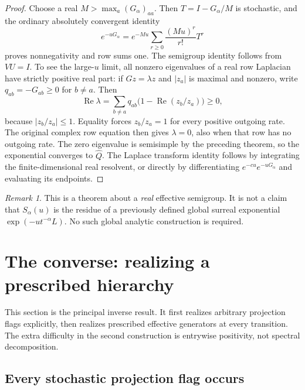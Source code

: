 \documentclass[11pt]{article}
\numberwithin{equation}{section}
\theoremstyle{definition}
\theoremstyle{remark}
\newtheorem{remark}[theorem]{Remark}
\newcommand{\Rea}{\operatorname{Re}}
\begin{document}
\begin{proof}
Choose a real $M>\max_a(G_\alpha)_{aa}$. Then
$T=I-G_\alpha/M$ is stochastic, and the ordinary absolutely convergent identity
\[
 e^{-uG_\alpha}=e^{-Mu}\sum_{r\ge0}\frac{(Mu)^r}{r!}T^r
\]
proves nonnegativity and row sums one. The semigroup identity follows from
$VU=I$. To see the large-$u$ limit, all nonzero eigenvalues of a real row
Laplacian have strictly positive real part: if $Gz=\lambda z$ and $|z_a|$ is
maximal and nonzero, write $q_{ab}=-G_{ab}\ge0$ for $b\ne a$. Then
\[
 \Rea\lambda=\sum_{b\ne a}q_{ab}
       \bigl(1-\Rea(z_b/z_a)\bigr)\ge0,
\]
because $|z_b/z_a|\le1$. Equality forces $z_b/z_a=1$ for every positive
outgoing rate. The original complex row equation then gives $\lambda=0$,
also when that row has no outgoing rate.
The zero eigenvalue is semisimple by the preceding theorem, so the exponential
converges to $\widehat Q$. The Laplace transform identity follows by integrating
the finite-dimensional real resolvent, or directly by differentiating
$e^{-cu}e^{-uG_\alpha}$ and evaluating its endpoints.
\end{proof}

\begin{remark}\label{markov:rem:realsemigroup}
This is a theorem about a \emph{real} effective semigroup. It is not a claim that
$S_\alpha(u)$ is the residue of a previously defined global surreal exponential
$\exp(-u t^{-\alpha}L)$. No such global analytic construction is required.
\end{remark}

\section{The converse: realizing a prescribed hierarchy}\label{markov:sec:inverse}

This section is the principal inverse result. It first realizes arbitrary
projection flags explicitly, then realizes prescribed effective generators at
every transition. The extra difficulty in the second construction is
entrywise positivity, not spectral decomposition.

\subsection{Every stochastic projection flag occurs}
\end{document}
